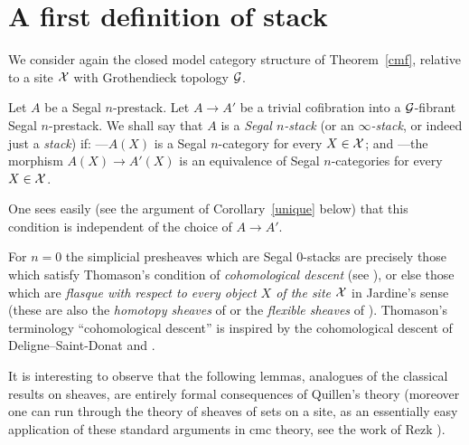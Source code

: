\clearpage
\section{A first definition of stack}
\label{notionchamppage}

We consider again the closed model category structure of
Theorem~\ref{cmf}, relative to a site ${\cal X}$ with
Grothendieck topology ${\cal G}$.

Let $A$ be a Segal $n$-prestack.
Let $A\rightarrow A'$ be a trivial cofibration into a ${\cal G}$-fibrant Segal
$n$-prestack.  We shall say that $A$ is a {\em Segal $n$-stack} (or an {\em
$\infty$-stack}, or indeed just a {\em stack}) if: \newline
---$A(X)$ is a Segal $n$-category for every $X\in {\cal X}$; and
\newline
---the morphism $A(X)\rightarrow A'(X)$ is an equivalence of
Segal $n$-categories for every $X\in {\cal X}$.

One sees easily (see the argument of Corollary~\ref{unique} below) that
this condition is independent of the choice of $A\rightarrow A'$.

For $n=0$ the simplicial presheaves which are Segal $0$-stacks are
pre\-cise\-ly those
which satisfy
Thomason's condition of {\em cohomological descent} (see
\cite{TravauxThomason}), or else those which are {\em
flasque
with respect to every object $X$ of the site ${\cal X}$} in Jardine's sense \cite{Jardine}
(these are also the {\em homotopy sheaves} of
\cite{kobe}
or the {\em flexible sheaves} of \cite{flexible}). Thomason's terminology
``cohomological descent''
is inspired by the cohomological descent of Deligne--Saint-Donat \cite{SGA4b}
and \cite{HodgeIII}.

It is interesting to observe that the following lemmas, analogues of the
classical results on sheaves, are entirely formal consequences of
Quillen's theory \cite{Quillen}
(moreover one can run through the theory of sheaves of sets on a site, as an
essentially easy application of these standard arguments in cmc theory, see
the work of Rezk \cite{Rezk}).

